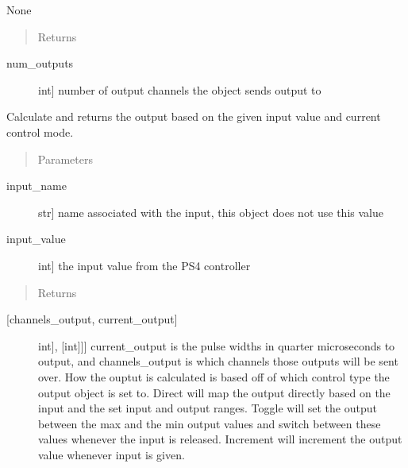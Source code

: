 \documentclass[letterpaper,10pt,english]{sphinxmanual}
\begin{document}
\begin{fulllineitems}
\begin{fulllineitems}
\sphinxAtStartPar
None
\begin{quote}\begin{description}
\item[{Returns}] \leavevmode
\end{description}\end{quote}
\begin{description}
\item[{num\_outputs}] \leavevmode{[}int{]}
\sphinxAtStartPar
number of output channels the object sends output to

\end{description}

\end{fulllineitems}


\begin{fulllineitems}
\label{\detokenize{generic:DigitalOutputObject.DigitalOutputObject.get_output}}
\sphinxAtStartPar
Calculate and returns the output based on the given input value and current control mode.
\begin{quote}\begin{description}
\item[{Parameters}] \leavevmode
\end{description}\end{quote}
\begin{description}
\item[{input\_name}] \leavevmode{[}str{]}
\sphinxAtStartPar
name associated with the input, this object does not use this value

\item[{input\_value}] \leavevmode{[}int{]}
\sphinxAtStartPar
the input value from the PS4 controller

\end{description}
\begin{quote}\begin{description}
\item[{Returns}] \leavevmode
\end{description}\end{quote}
\begin{description}
\item[{{[}channels\_output, current\_output{]}}] \leavevmode{[}{[}{[}int{]}, {[}int{]}{]}{]}
\sphinxAtStartPar
current\_output is the pulse widths in quarter microseconds to output, and channels\_output
is which channels those outputs will be sent over. How the ouptut is calculated is based
off of which control type the output object is set to. Direct will map the output directly
based on the input and the set input and output ranges. Toggle will set the output between
the max and the min output values and switch between these values whenever the input is
released. Increment will increment the output value whenever input is given.


\end{description}
\end{fulllineitems}
\end{fulllineitems}
\end{document}
